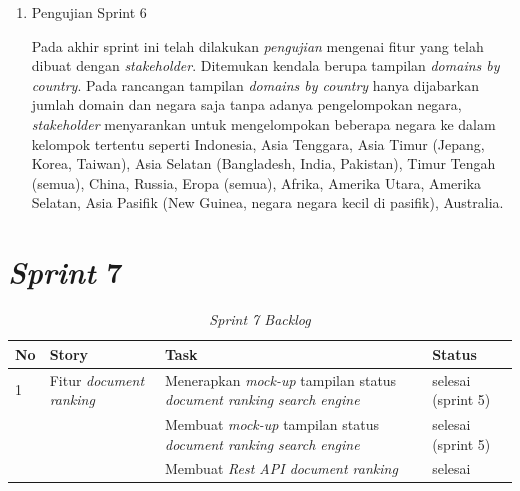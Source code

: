\begin{enumerate}[label=\alph*)., leftmargin=1\parindent]
	\item{Pengujian Sprint 6} 
	
	Pada akhir sprint ini telah dilakukan \textit{pengujian} mengenai fitur yang telah dibuat dengan \textit{stakeholder}. Ditemukan kendala berupa tampilan \textit{domains by country}. Pada rancangan tampilan \textit{domains by country} hanya dijabarkan jumlah domain dan negara saja tanpa adanya pengelompokan negara, \textit{stakeholder} menyarankan untuk mengelompokan beberapa negara ke dalam kelompok tertentu seperti Indonesia, Asia Tenggara, Asia Timur (Jepang, Korea, Taiwan), Asia Selatan (Bangladesh, India, Pakistan), Timur Tengah (semua), China, Russia, Eropa (semua), Afrika, Amerika Utara, Amerika Selatan, Asia Pasifik (New Guinea, negara negara kecil di pasifik), Australia.
	
\end{enumerate}




\section{\textit{Sprint} 7}

\begin{longtable}{@{}|p{0.5cm}|p{4cm}|p{6cm}|p{2cm}|@{}}
	\caption{\textit{Sprint 7 Backlog}}\\	
	\hline
	\textbf{No} & \textbf{Story} & \textbf{Task} & \textbf{Status} \\
	\hline
	1 & Fitur \textit{document ranking} & Menerapkan \textit{mock-up} tampilan status \textit{document ranking} \textit{search engine} & selesai (sprint 5) \\
	\cline{1-4}
	\hline
	& & Membuat \textit{mock-up} tampilan status \textit{document ranking} \textit{search engine} & selesai (sprint 5) \\
	\cline{3-4}
	& & Membuat \textit{Rest API document ranking}  & selesai \\
	\cline{3-4}
	\cline{3-4}
	\hline
	
\end{longtable}

